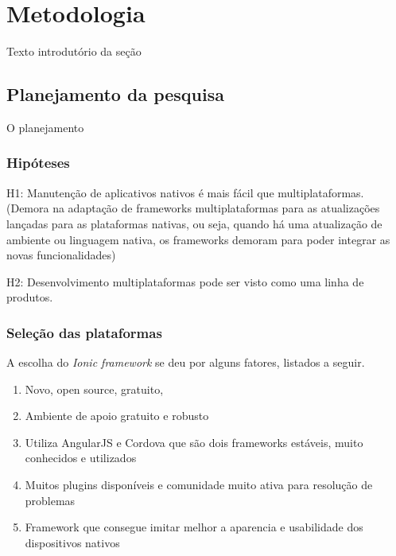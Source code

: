 \chapter{Metodologia} \label{metodologia}

Texto introdutório da seção

\section{Planejamento da pesquisa} \label{sec:planejamento}

O planejamento

\subsection{Hipóteses} \label{subsec:hipoteses}

H1: Manutenção de aplicativos nativos é mais fácil que multiplataformas. 
(Demora na adaptação de frameworks multiplataformas para as atualizações lançadas para as plataformas nativas, ou seja, quando há uma atualização de ambiente ou linguagem nativa,
os frameworks demoram para poder integrar as novas funcionalidades)


H2: Desenvolvimento multiplataformas pode ser visto como uma linha de produtos.


\subsection{Seleção das plataformas} \label{subsec:selecaodasplataformas}

A escolha do \textit{Ionic framework} se deu por alguns fatores, listados a seguir. 
\begin{enumerate}
    \item Novo, open source, gratuito,
    \item Ambiente de apoio gratuito e robusto
    \item Utiliza AngularJS e Cordova que são dois frameworks estáveis, muito conhecidos e utilizados
    \item Muitos plugins disponíveis e comunidade muito ativa para resolução de problemas %
    \item Framework que consegue imitar melhor a aparencia e usabilidade dos dispositivos nativos %
\end{enumerate}
 
\begin{comment}
Porque Ionic? Porque não, outro? Quais os criterios usados para escolher o Ionic?
Ionic é open source, gratuito, muito focado em performance e possui html e css otimizados para dispositivos móveis.
\end{comment}

